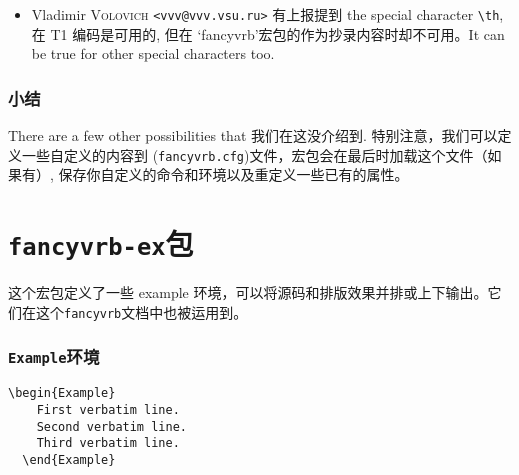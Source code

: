 \documentclass[twoside]{article}
\newcommand\FVrbPackage{`\textsf{fancyvrb}'}
\begin{document}
\begin{changebar}
\begin{itemize}
  \item Vladimir \textsc{Volovich} \verb+<vvv@vvv.vsu.ru>+ 有上报提到 the
  special character \verb+\th+, 在 T1 编码是可用的, 但在 \FVrbPackage 宏包的作为抄录内容时却不可用。It can be true for other special
  characters too.
\end{itemize}

\iffalse

\section{Thanks}

  For interesting comments and suggestions, we would like to thank specially
(alphabetic order): Philippe \textsc{Esperet}
\url{esperet@marie.polytechnique.fr}, Michael \textsc{Friendly}
\url{friendly@hotspur.psych.yorku.ca}, Rolf \textsc{Niepraschk}
\url{niepraschk@gmx.de} and for bug reports Mario \textsc{Hassler}
\relax\unskip\break
\url{HASSLER@ippnv2.ipp.kfa-juelich.de}, Mikhail \textsc{Kolodin}
\relax\unskip\break
\url{myke@morrigan.spb.su}, Andreas Matthias, Ulrich M. Schwarz, and Vladimir \textsc{Volovich}
\verb+<vvv@vvv.vsu.ru>+.


\fi
\section{小结}

  There are a few other possibilities that 我们在这没介绍到.
  特别注意，我们可以定义一些自定义的内容到
(\texttt{fancyvrb.cfg})文件，宏包会在最后时加载这个文件（如果有）, 
保存你自定义的命令和环境以及重定义一些已有的属性。


\clearpage


\part{\texttt{fancyvrb-ex}包}
这个宏包定义了一些 example 环境，可以将源码和排版效果并排或上下输出。它们在这个\texttt{fancyvrb}文档中也被运用到。

\section{\texttt{Example}环境}

\begin{Verbatim}[gobble=2]
  \begin{Example}
    First verbatim line.
    Second verbatim line.
    Third verbatim line.
  \end{Example}
\end{Verbatim}


\end{changebar}
\end{document}
